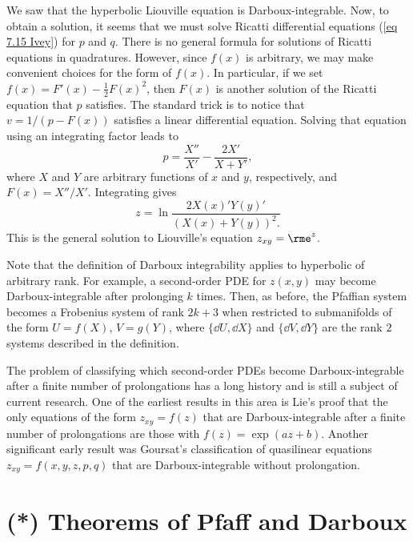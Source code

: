 \begin{example}
    We saw that the hyperbolic Liouville equation is Darboux-integrable. Now, to obtain a solution, it seems that we must solve Ricatti differential equations (\ref{eq 7.15 Ivey}) for $p$ and $q$. There is no general formula for solutions of Ricatti equations in quadratures. However, since $f(x)$ is arbitrary, we may make convenient choices for the form of $f(x)$. In particular, if we set $f(x)=F'(x)-\frac12 F(x)^2$, then $F(x)$ is another solution of the Ricatti equation that $p$ satisfies. The standard trick is to notice that $v=1/(p-F(x))$ satisfies a linear differential equation. Solving that equation using an integrating factor leads to 
    \[p=\frac{X''}{X'}-\frac{2X'}{X+Y'},\]
    where $X$ and $Y$ are arbitrary functions of $x$ and $y$, respectively, and $F(x)=X''/X'$. Integrating gives 
    \[z=\ln \frac{2X(x)'Y(y)'}{(X(x)+Y(y))^2.}\label{eq Liouville general solution}\]
    This is the general solution to Liouville's equation $z_{xy}=\rme^z$.
\end{example}

Note that the definition of Darboux integrability applies to hyperbolic of arbitrary rank. For example, a second-order PDE for $z(x,y)$ may become Darboux-integrable after prolonging $k$ times. Then, as before, the Pfaffian system becomes a Frobenius system of rank $2k+3$ when restricted to submanifolds of the form $U=f(X)$, $V=g(Y)$, where $\{\dd U,\dd X\}$ and $\{\dd V,\dd Y\}$ are the rank $2$ systems described in the definition. 

The problem of classifying which second-order PDEs become Darboux-integrable after a finite number of prolongations has a long history and is still a subject of current research. One of the earliest results in this area is Lie's proof that the only equations of the form $z_{xy}=f(z)$ that are Darboux-integrable after a finite number of prolongations are those with $f(z)=\exp(az+b)$. Another significant early result was Goursat's classification of quasilinear equations $z_{xy}=f(x,y,z,p,q)$ that are Darboux-integrable without prolongation. 









\section{(*) Theorems of Pfaff and Darboux}\label{sec: pfaff darboux thms}

